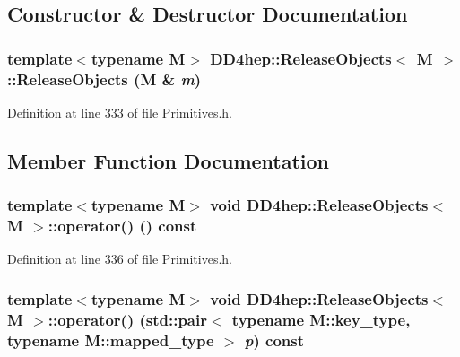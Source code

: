 \subsection{Constructor \& Destructor Documentation}
\hypertarget{class_d_d4hep_1_1_release_objects_ac8bed15483a32f35c3a157ff1a906080}{
\subsubsection[{ReleaseObjects}]{\setlength{\rightskip}{0pt plus 5cm}template$<$typename M$>$ {\bf DD4hep::ReleaseObjects}$<$ M $>$::{\bf ReleaseObjects} (M \& {\em m})}}
\label{class_d_d4hep_1_1_release_objects_ac8bed15483a32f35c3a157ff1a906080}


Definition at line 333 of file Primitives.h.

\subsection{Member Function Documentation}
\hypertarget{class_d_d4hep_1_1_release_objects_a4473253d578355e0ff3cffe217bde84b}{
\subsubsection[{operator()}]{\setlength{\rightskip}{0pt plus 5cm}template$<$typename M$>$ void {\bf DD4hep::ReleaseObjects}$<$ M $>$::operator() () const}}
\label{class_d_d4hep_1_1_release_objects_a4473253d578355e0ff3cffe217bde84b}


Definition at line 336 of file Primitives.h.\hypertarget{class_d_d4hep_1_1_release_objects_a2d689edda45dc3fc961818c874c53fdf}{
\subsubsection[{operator()}]{\setlength{\rightskip}{0pt plus 5cm}template$<$typename M$>$ void {\bf DD4hep::ReleaseObjects}$<$ M $>$::operator() (std::pair$<$ typename M::key\_\-type, typename M::mapped\_\-type $>$ {\em p}) const}}
\label{class_d_d4hep_1_1_release_objects_a2d689edda45dc3fc961818c874c53fdf}


